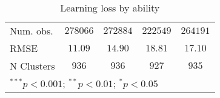 \begin{table}
\begin{center}
\begin{tabular}{l c c c c}
Num. obs.                    & $278066$      & $272884$      & $222549$      & $264191$      \\
RMSE                         & $11.09$       & $14.90$       & $18.81$       & $17.10$       \\
N Clusters                   & $936$         & $936$         & $927$         & $935$         \\
\hline
\multicolumn{5}{l}{\scriptsize{$^{***}p<0.001$; $^{**}p<0.01$; $^{*}p<0.05$}}
\end{tabular}
\caption{Learning loss by ability}
\label{tableability}
\end{center}
\end{table}

